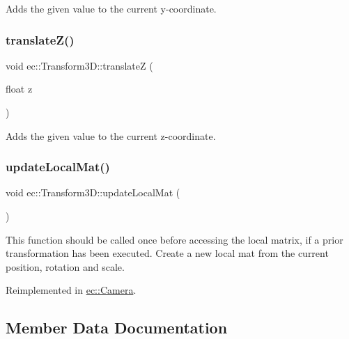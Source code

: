 Adds the given value to the current y-\/coordinate. \mbox{\label{classec_1_1_transform3_d_a13ea4d1c69ec17c2ce4c1d8b4068639a}} 
\subsubsection{\texorpdfstring{translate\+Z()}{translateZ()}}
{\footnotesize\ttfamily void ec\+::\+Transform3\+D\+::translateZ (\begin{DoxyParamCaption}\item[{float}]{z }\end{DoxyParamCaption})}

Adds the given value to the current z-\/coordinate. \mbox{\label{classec_1_1_transform3_d_a68d259da063ea2aff48720ae55870445}} 
\subsubsection{\texorpdfstring{update\+Local\+Mat()}{updateLocalMat()}}
{\footnotesize\ttfamily void ec\+::\+Transform3\+D\+::update\+Local\+Mat (\begin{DoxyParamCaption}{ }\end{DoxyParamCaption})\hspace{0.3cm}{\ttfamily [virtual]}}

This function should be called once before accessing the local matrix, if a prior transformation has been executed. Create a new local mat from the current position, rotation and scale. 

Reimplemented in \mbox{\hyperlink{classec_1_1_camera_acff95ac4ca039715d67c83111d03b8c1}{ec\+::\+Camera}}.



\subsection{Member Data Documentation}
\mbox{\label{classec_1_1_transform3_d_a5d7ebb5dc842dc73fe0840f3e3f95ab8}} 
